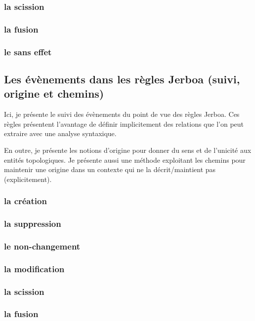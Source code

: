 \documentclass[11pt]{article}
\begin{document}
\subsubsection{la scission}
\label{sec:org46dd5c6}
\subsubsection{la fusion}
\label{sec:orgb5551e5}
\subsubsection{le sans effet}
\label{sec:org6bdbd69}
\subsection{Les évènements dans les règles Jerboa (suivi, origine et chemins)}
\label{sec:org3303932}
Ici, je présente le suivi des évènements du point de vue des règles Jerboa. Ces
règles présentent l'avantage de définir implicitement des relations que l'on
peut extraire avec une analyse syntaxique.

En outre, je présente les notions d'origine pour donner du sens et de l'unicité
aux entités topologiques. Je présente aussi une méthode exploitant les chemins
pour maintenir une origine dans un contexte qui ne la décrit/maintient pas (explicitement).
\subsubsection{la création}
\label{sec:orgd4e5636}
\subsubsection{la suppression}
\label{sec:org447a296}
\subsubsection{le non-changement}
\label{sec:org2dcfa75}
\subsubsection{la modification}
\label{sec:orgff223d1}
\subsubsection{la scission}
\label{sec:org54092a9}
\subsubsection{la fusion}
\label{sec:org249aa2e}
\end{document}
